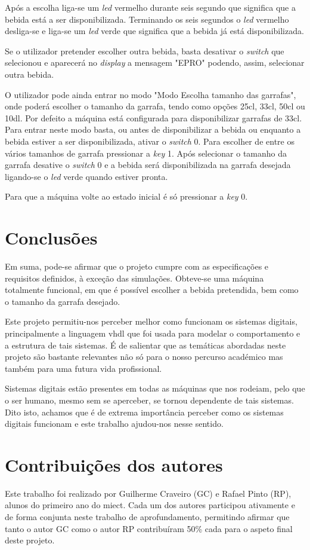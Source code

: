 \documentclass{report}
\begin{document}
Após a escolha liga-se um \textit{led} vermelho durante seis segundo que significa que a bebida está a ser disponibilizada. Terminando os seis segundos o \textit{led} vermelho desliga-se e liga-se um \textit{led} verde que significa que a bebida já está disponibilizada.

Se o utilizador pretender escolher outra bebida, basta desativar o \textit{switch} que selecionou e aparecerá no \textit{display} a mensagem "EPRO" podendo, assim, selecionar outra bebida.

O utilizador pode ainda entrar no modo "Modo Escolha tamanho das garrafas", onde poderá escolher o tamanho da garrafa, tendo como opções 25cl, 33cl, 50cl ou 10dl. Por defeito a máquina está configurada para disponibilizar garrafas de 33cl. Para entrar neste modo basta, ou antes de disponibilizar a bebida ou enquanto a bebida estiver a ser disponibilizada, ativar o \textit{switch} 0. Para escolher de entre os vários tamanhos de garrafa pressionar a \textit{key} 1. Após selecionar o tamanho da garrafa desative o \textit{switch} 0 e a bebida será disponibilizada na garrafa desejada ligando-se o \textit{led} verde quando estiver pronta. 

Para que a máquina volte ao estado inicial é só pressionar a \textit{key} 0.

\chapter{Conclusões}
\label{chap.conclusao}
Em suma, pode-se afirmar que o projeto cumpre com as especificações e requisitos definidos, à exceção das simulações. Obteve-se uma máquina totalmente funcional, em que é possível escolher a bebida pretendida, bem como o tamanho da garrafa desejado. 

Este projeto permitiu-nos perceber melhor como funcionam os sistemas digitais, principalmente a linguagem \ac{vhdl} que foi usada para modelar o comportamento e a estrutura de tais sistemas. É de salientar que as temáticas abordadas neste projeto são bastante relevantes não só para o nosso percurso académico mas também para uma futura vida profissional.

Sistemas digitais estão presentes em todas as máquinas que nos rodeiam, pelo que o ser humano, mesmo sem se aperceber, se tornou dependente de tais sistemas. Dito isto, achamos que é de extrema importância perceber como os sistemas digitais funcionam e este trabalho ajudou-nos nesse sentido.

\chapter*{Contribuições dos autores}
Este trabalho foi realizado por Guilherme Craveiro (GC) e Rafael Pinto (RP), alunos do primeiro ano do \ac{miect}. Cada um dos autores participou ativamente e de forma conjunta neste trabalho de aprofundamento, permitindo afirmar que tanto o autor GC como o autor RP contribuíram 50\% cada para o aspeto final deste projeto. 
\end{document}
